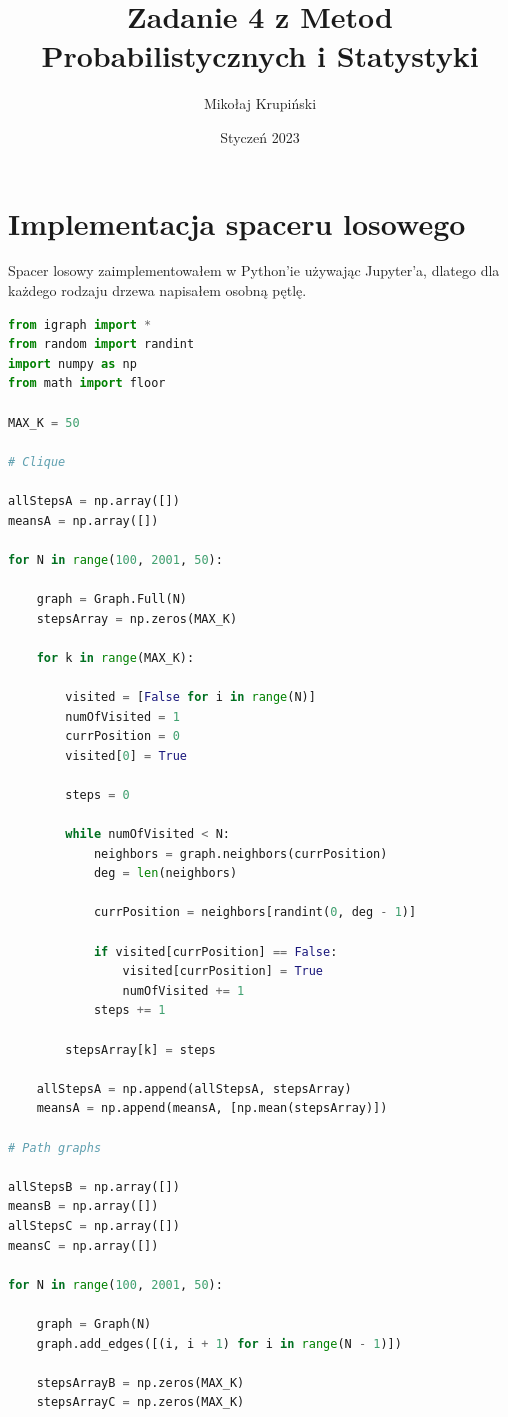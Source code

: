 \documentclass[12pt]{article}
\title{Zadanie 4 z Metod Probabilistycznych i Statystyki}
\author{Mikołaj Krupiński}
\date{Styczeń 2023}
\begin{document}
\maketitle

\section{Implementacja spaceru losowego}

Spacer losowy zaimplementowałem w Python'ie używając Jupyter'a, dlatego dla każdego rodzaju drzewa napisałem osobną pętlę.

\begin{lstlisting}[language=Python, caption=random\_walk.py]
from igraph import *
from random import randint
import numpy as np
from math import floor
    
MAX_K = 50

# Clique

allStepsA = np.array([])
meansA = np.array([])

for N in range(100, 2001, 50):

    graph = Graph.Full(N)
    stepsArray = np.zeros(MAX_K)

    for k in range(MAX_K):

        visited = [False for i in range(N)]
        numOfVisited = 1
        currPosition = 0
        visited[0] = True

        steps = 0

        while numOfVisited < N:
            neighbors = graph.neighbors(currPosition)
            deg = len(neighbors)
            
            currPosition = neighbors[randint(0, deg - 1)]

            if visited[currPosition] == False:
                visited[currPosition] = True
                numOfVisited += 1
            steps += 1

        stepsArray[k] = steps

    allStepsA = np.append(allStepsA, stepsArray)
    meansA = np.append(meansA, [np.mean(stepsArray)])

# Path graphs

allStepsB = np.array([])
meansB = np.array([])
allStepsC = np.array([])
meansC = np.array([])

for N in range(100, 2001, 50):

    graph = Graph(N)
    graph.add_edges([(i, i + 1) for i in range(N - 1)])

    stepsArrayB = np.zeros(MAX_K)
    stepsArrayC = np.zeros(MAX_K)


\end{lstlisting}
\end{document}
